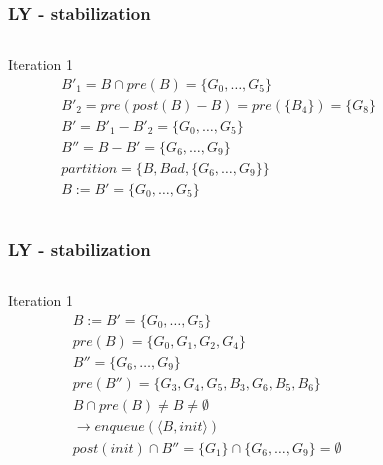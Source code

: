 \documentclass[11pt,handout]{beamer}
\begin{document}
\begin{frame}[fragile]
  \frametitle{LY - stabilization}
  \begin{columns}
    \begin{column}{0.5\textwidth}
      Iteration 1
      \begin{align*}
        & B'_1 = B \cap pre(B) = \{G_0,\dots,G_5\} \\
        & B'_2 = pre(post(B) - B) = pre(\{B_4\}) = \{G_8\} \\
        & B' = B'_1 - B'_2 = \{G_0,\dots,G_5\} \\
        & B'' = B - B' = \{G_6,\dots,G_9\} \\
        & partition = \{B,Bad,\{G_6,\dots,G_9\} \} \\
        & B := B' = \{G_0,\dots,G_5\}
      \end{align*}
    \end{column}
    \begin{column}{0.5\textwidth}%
      
    \end{column}
  \end{columns}
\end{frame}

\begin{frame}[fragile]
  \frametitle{LY - stabilization}
  \begin{columns}
    \begin{column}{0.5\textwidth}
      Iteration 1
      \begin{align*}
        & B := B' = \{G_0,\dots,G_5\} \\
        & pre(B) = \{G_0,G_1,G_2,G_4\} \\
        & B'' = \{G_6,\dots,G_9\} \\
        & pre(B'') = \{G_3,G_4,G_5,B_3,G_6,B_5,B_6\} \\
        & B \cap pre(B) \neq B \neq \emptyset \\
        & \to enqueue(\langle {B,init} \rangle) \\
        & post(init) \cap B'' = \{G_1\} \cap \{G_6,\dots,G_9\} = \emptyset
      \end{align*}
    \end{column}
    \begin{column}{0.5\textwidth}%
      
    \end{column}
  \end{columns}
\end{frame}
\end{document}
